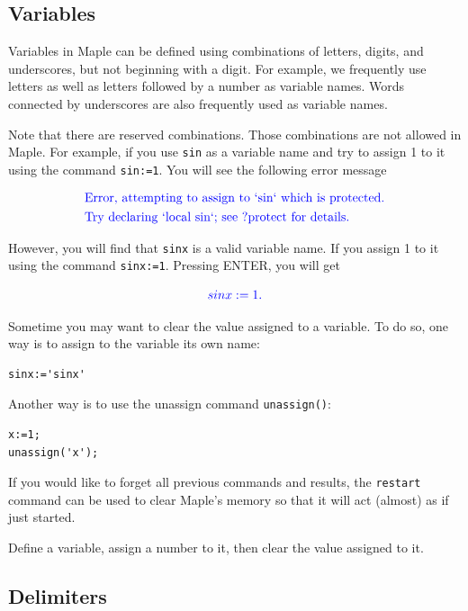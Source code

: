 \documentclass[
  12pt]{elegantbook}
\begin{document}
\hypertarget{variables}{%
\subsection{Variables}\label{variables}}

Variables in Maple can be defined using combinations of letters, digits, and underscores, but not beginning with a digit. For example, we frequently use letters as well as letters followed by a number as variable names. Words connected by underscores are also frequently used as variable names.

Note that there are reserved combinations. Those combinations are not allowed in Maple. For example, if you use \texttt{sin} as a variable name and try to assign 1 to it using the command \texttt{sin:=1}. You will see the following error message

\[
\color{blue}{
  \begin{aligned}
  &\text{Error, attempting to assign to `sin` which is protected.}\\
  &\text{Try declaring `local sin`; see ?protect for details.}
  \end{aligned}
  }
\]

However, you will find that \texttt{sinx} is a valid variable name. If you assign 1 to it using the command \texttt{sinx:=1}. Pressing ENTER, you will get

\[\color{blue}{sinx := 1}.\]

Sometime you may want to clear the value assigned to a variable. To do so, one way is to assign to the variable its own name:

\begin{verbatim}
sinx:='sinx'
\end{verbatim}

Another way is to use the unassign command \texttt{unassign()}:

\begin{verbatim}
x:=1;
unassign('x');
\end{verbatim}

If you would like to forget all previous commands and results, the \texttt{restart} command can be used to clear Maple's memory so that it will act (almost) as if just started.

\begin{exercise}
Define a variable, assign a number to it, then clear the value assigned to it.
\end{exercise}

\hypertarget{delimiters}{%
\subsection{Delimiters}\label{delimiters}}
\end{document}
